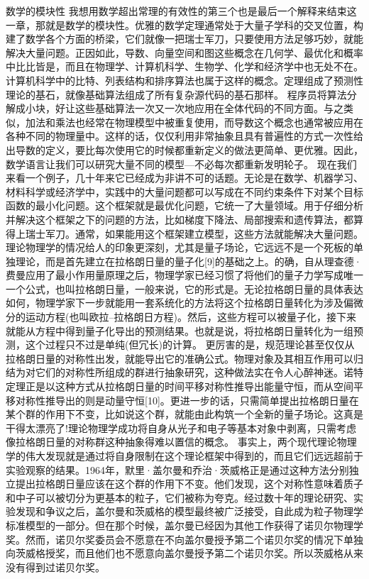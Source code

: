 数学的模块性
我想用数学超出常理的有效性的第三个也是最后一个解释来结束这一章，那就是数学的模块性。优雅的数学定理通常处于大量子学科的交叉位置，构建了数学各个方面的桥梁，它们就像一把瑞士军刀，只要使用方法足够巧妙，就能解决大量问题。正因如此，导数、向量空间和图这些概念在几何学、最优化和概率中比比皆是，而且在物理学、计算机科学、生物学、化学和经济学中也无处不在。计算机科学中的比特、列表结构和排序算法也属于这样的概念。定理组成了预测性理论的基石，就像基础算法组成了所有复杂源代码的基石那样。
程序员将算法分解成小块，好让这些基础算法一次又一次地应用在全体代码的不同方面。与之类似，加法和乘法也经常在物理模型中被重复使用，而导数这个概念也通常被应用在各种不同的物理量中。这样的话，仅仅利用非常抽象且具有普遍性的方式一次性给出导数的定义，要比每次使用它的时候都重新定义的做法更简单、更优雅。因此，数学语言让我们可以研究大量不同的模型---不必每次都重新发明轮子。
现在我们来看一个例子，几十年来它已经成为非讲不可的话题。无论是在数学、机器学习、材料科学或经济学中，实践中的大量问题都可以写成在不同约束条件下对某个目标函数的最小化问题。这个框架就是最优化问题，它统一了大量领域。用于仔细分析并解决这个框架之下的问题的方法，比如梯度下降法、局部搜索和遗传算法，都算得上瑞士军刀。通常，如果能用这个框架建立模型，这些方法就能解决大量问题。
理论物理学的情况给人的印象更深刻，尤其是量子场论，它远远不是一个死板的单独理论，而是首先建立在拉格朗日量的量子化[9]的基础之上。的确，自从理查德·费曼应用了最小作用量原理之后，物理学家已经习惯了将他们的量子力学写成唯一一个公式，也叫拉格朗日量，一般来说，它的形式是。无论拉格朗日量的具体表达如何，物理学家下一步就能用一套系统化的方法将这个拉格朗日量转化为涉及偏微分的运动方程(也叫欧拉–拉格朗日方程)。然后，这些方程可以被量子化，接下来就能从方程中得到量子化导出的预测结果。也就是说，将拉格朗日量转化为一组预测，这个过程只不过是单纯(但冗长)的计算。
更厉害的是，规范理论甚至仅仅从拉格朗日量的对称性出发，就能导出它的准确公式。物理对象及其相互作用可以归结为对它们的对称性所组成的群进行抽象研究，这种做法实在令人心醉神迷。诺特定理正是以这种方式从拉格朗日量的时间平移对称性推导出能量守恒，而从空间平移对称性推导出的则是动量守恒[10]。更进一步的话，只需简单提出拉格朗日量在某个群的作用下不变，比如说这个群，就能由此构筑一个全新的量子场论。这真是干得太漂亮了!理论物理学成功将自身从光子和电子等基本对象中剥离，只需考虑像拉格朗日量的对称群这种抽象得难以置信的概念。
事实上，两个现代理论物理学的伟大发现就是通过将自身限制在这个理论框架中得到的，而且它们远远超前于实验观察的结果。1964年，默里·盖尔曼和乔治·茨威格正是通过这种方法分别独立提出拉格朗日量应该在这个群的作用下不变。他们发现，这个对称性意味着质子和中子可以被切分为更基本的粒子，它们被称为夸克。经过数十年的理论研究、实验发现和争议之后，盖尔曼和茨威格的模型最终被广泛接受，自此成为粒子物理学标准模型的一部分。但在那个时候，盖尔曼已经因为其他工作获得了诺贝尔物理学奖。然而，诺贝尔奖委员会不愿意在不向盖尔曼授予第二个诺贝尔奖的情况下单独向茨威格授奖，而且他们也不愿意向盖尔曼授予第二个诺贝尔奖。所以茨威格从来没有得到过诺贝尔奖。
